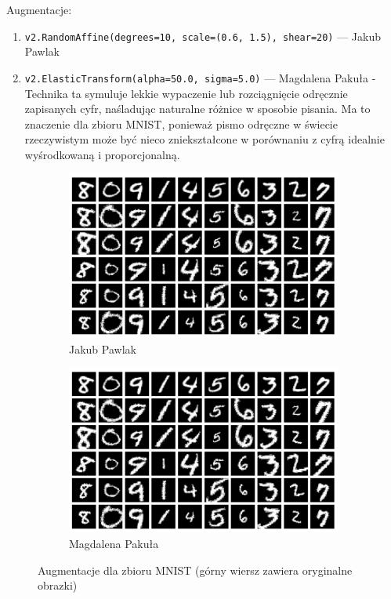 \documentclass[10pt]{article}
\begin{document}
Augmentacje:
\begin{enumerate}
    \item \texttt{v2.RandomAffine(degrees=10, scale=(0.6, 1.5), shear=20)} --- Jakub Pawlak
    \item \texttt{v2.ElasticTransform(alpha=50.0, sigma=5.0)} --- Magdalena Pakuła -
          Technika ta symuluje lekkie wypaczenie lub rozciągnięcie odręcznie zapisanych cyfr, naśladując naturalne różnice w sposobie pisania.
          Ma to znaczenie dla zbioru MNIST, ponieważ pismo odręczne w świecie rzeczywistym może być nieco zniekształcone w porównaniu z cyfrą idealnie wyśrodkowaną i proporcjonalną.
\end{enumerate}

\begin{figure}[H]\centering
    \begin{subfigure}[t]{.45\textwidth}
        \centering
        \includegraphics[width=.7\linewidth]{img/kuba/mnist/augmentations.png}
        \caption{Jakub Pawlak}
    \end{subfigure}
    \begin{subfigure}[t]{.45\textwidth}
        \centering
        \includegraphics[width=.7\linewidth]{img/kuba/mnist/augmentations.png}
        \caption{Magdalena Pakuła}
    \end{subfigure}
    \caption{Augmentacje dla zbioru MNIST (górny wiersz zawiera oryginalne obrazki)}
\end{figure}
\end{document}
